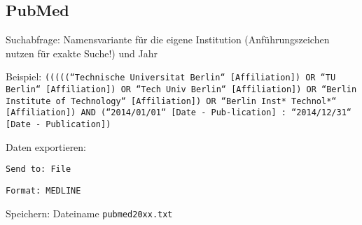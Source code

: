 \subsection*{PubMed}
\begin{compactitem}
\item Suchabfrage: Namensvariante für die eigene Institution (Anführungszeichen nutzen für exakte Suche!) und Jahr 
	\begin{compactitem}
    \item Beispiel: \texttt{(((((``Technische Universitat Berlin`` [Affiliation]) OR \newline ``TU Berlin`` [Affiliation]) OR ``Tech Univ Berlin`` [Affiliation]) \newline OR ``Berlin Institute of Technology`` [Affiliation]) OR ``Berlin \newline Inst* Technol*`` [Affiliation]) AND (``2014/01/01`` [Date - Pub-\newline lication] : ``2014/12/31`` [Date - Publication])}
    \end{compactitem}
\item Daten exportieren: 
	\begin{compactitem}
    \item \texttt{Send to: File}
    \item \texttt{Format: MEDLINE}
    \end{compactitem}
\item Speichern: Dateiname \texttt{pubmed20xx.txt}
\end{compactitem}

